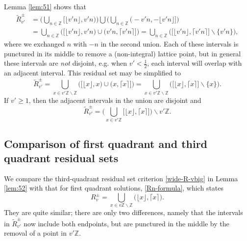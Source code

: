 \documentclass[12pt,letterpaper, reqno]{amsart}
\theoremstyle{definition}
\theoremstyle{remark}
\newcommand{\ZZ}{\ensuremath{\mathbb{Z}}}
\newcommand{\vv}{{v'}}
\newcommand{\R}{{R}}
\newcommand{\floor}[1]{\lfloor{#1}\rfloor}
\newcommand{\ceil}[1]{\lceil{#1}\rceil}
\begin{document}
Lemma \ref{lem:51}  shows that 
\begin{align*}
\widetilde{\R}^\pm_\vv &=\bigg( \bigcup_{n\in\ZZ} \big[\floor{{\vv }n},\vv n \big) \bigg) \bigcup 
\bigg(\bigcup_{n\in\ZZ}\big(-\vv n, -\floor{{\vv} n} \big]\bigg)\\
&= \bigcup_{n\in\ZZ}\bigg( \big[\floor{{\vv }n},\vv n \big) \cup \big(\vv n,\ceil{\vv n} \big] \bigg)
= \bigcup_{n\in\ZZ}\bigg( \big[\floor{{\vv }n},\ceil{\vv n} \big] \smallsetminus\{\vv n\}\bigg),
\end{align*}
where we exchanged $n$ with $-n$ in the second union.  
Each of  these intervals is punctured in its middle to remove a (non-integral) lattice point, but in general these intervals are {\em not} disjoint, e.g. when $\vv < \frac12$, each interval will  overlap with an adjacent interval.
This residual set may be simplified to
\begin{equation}\label{wide-R}
\widetilde{\R}^\pm_\vv = \bigcup_{x\in {\vv}\ZZ \smallsetminus\ZZ} \bigg(\big[ \floor{x},x\big)\cup \big(x, \ceil{x}\big] \bigg) 
= \bigcup_{x\in {\vv}\ZZ \smallsetminus\ZZ} \bigg(\big[ \floor{x}, \ceil{x}\big] \smallsetminus\{x\} \bigg).
\end{equation}
If $\vv\geq 1$, then the adjacent intervals in the union are disjoint and
\begin{equation}\label{wide-R-vbig}
\widetilde{\R}^\pm_\vv =\bigg( \bigcup_{x\in {\vv}\ZZ}\big[ \floor{x}, \ceil{x}\big] \bigg) \smallsetminus \vv\ZZ.
\end{equation}

%
%
\subsection{Comparison  of  first quadrant and third quadrant residual sets }\label{sec52}
We compare  the third-quadrant residual set criterion \eqref{wide-R-vbig}
in Lemma \ref{lem:52} 
with that for  first quadrant solutions,   \eqref{Rn-formula}, which states
  \[
 R_{v}^{\pm} = \bigcup_{x\in v\ZZ \smallsetminus \ZZ} \big(\floor{x},\ceil{x} \big) .
\]
They are quite similar; there  are only  two  differences, namely that the intervals in $\widetilde{R}^\pm_{\vv}$ now include both endpoints,  
but are  punctured in the middle by the removal of a point in $\vv\ZZ$. 
\end{document}
